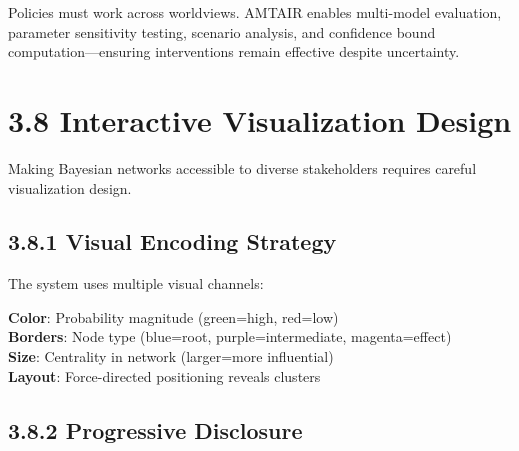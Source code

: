 \documentclass[
  11pt,
  letterpaper,
]{book}
\begin{document}
\begin{tcolorbox}[enhanced jigsaw, toprule=.15mm, colbacktitle=quarto-callout-tip-color!10!white, opacitybacktitle=0.6, leftrule=.75mm, coltitle=black, rightrule=.15mm, opacityback=0, bottomtitle=1mm, title=\textcolor{quarto-callout-tip-color}{\faLightbulb}\hspace{0.5em}{Cross-Worldview Robustness}, toptitle=1mm, breakable, titlerule=0mm, left=2mm, arc=.35mm, colframe=quarto-callout-tip-color-frame, bottomrule=.15mm, colback=white]

Policies must work across worldviews. AMTAIR enables multi-model
evaluation, parameter sensitivity testing, scenario analysis, and
confidence bound computation---ensuring interventions remain effective
despite uncertainty.

\end{tcolorbox}

\section*{3.8 Interactive Visualization
Design}\label{sec-visualization-design}


Making Bayesian networks accessible to diverse stakeholders requires
careful visualization design.

\subsection*{3.8.1 Visual Encoding Strategy}\label{sec-visual-encoding}

The system uses multiple visual channels:

\textbf{Color}: Probability magnitude (green=high, red=low)\\
\textbf{Borders}: Node type (blue=root, purple=intermediate,
magenta=effect)\\
\textbf{Size}: Centrality in network (larger=more influential)\\
\textbf{Layout}: Force-directed positioning reveals clusters

\subsection*{3.8.2 Progressive
Disclosure}\label{sec-progressive-disclosure}
\end{document}
